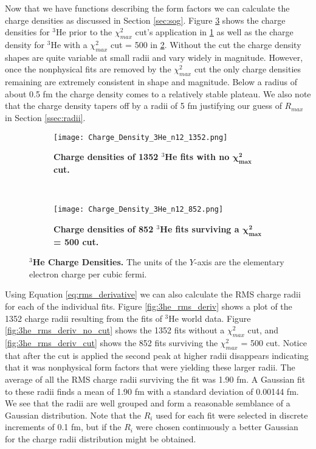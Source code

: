 Now that we have functions describing the form factors we can calculate the charge densities as discussed in Section \ref{sec:sog}. Figure \ref{fig:3he_charge_density} shows the charge densities for $^3$He prior to the $\chi^2_{max}$ cut's application in \ref{fig:3he_charge_density_no_cut} as well as the charge density for $^3$He with a $\chi^2_{max}$ cut = 500 in \ref{fig:3he_charge_density_cut}. Without the cut the charge density shapes are quite variable at small radii and vary widely in magnitude. However, once the nonphysical fits are removed by the $\chi^2_{max}$ cut the only charge densities remaining are extremely consistent in shape and magnitude. Below a radius of about 0.5 fm the charge density comes to a relatively stable plateau. We also note that the charge density tapers off by a radii of 5 fm justifying our guess of $R_{max}$ in Section \ref{ssec:radii}. %

\begin{figure}[!ht]
\begin{subfigure}{1.\textwidth}
  \centering
  \texttt{[image: Charge\_Density\_3He\_n12\_1352.png]}
  \caption{\bf{Charge densities of 1352 $^3$He fits with no $\boldsymbol{\chi^2_{max}}$ cut.}}
  \label{fig:3he_charge_density_no_cut}
\end{subfigure}\\
\begin{subfigure}{1.\textwidth}
  \centering
  \texttt{[image: Charge\_Density\_3He\_n12\_852.png]}
  \caption{\bf{Charge densities of 852 $^3$He fits surviving a $\boldsymbol{\chi^2_{max}}$ = 500 cut.}}
  \label{fig:3he_charge_density_cut}
\end{subfigure}
\caption[$^3$He Charge Densities]{{\bf{$^3$He Charge Densities.}} The units of the $Y$-axis are the elementary electron charge per cubic fermi.}
\label{fig:3he_charge_density}
\end{figure}

Using Equation \ref{eq:rms_derivative} we can also calculate the RMS charge radii for each of the individual fits. Figure \ref{fig:3he_rms_deriv} shows a plot of the 1352 charge radii resulting from the fits of $^3$He world data. Figure \ref{fig:3he_rms_deriv_no_cut} shows the 1352 fits without a $\chi^2_{max}$ cut, and \ref{fig:3he_rms_deriv_cut} shows the 852 fits surviving the $\chi^2_{max}$ = 500 cut. Notice that after the cut is applied the second peak at higher radii disappears indicating that it was nonphysical form factors that were yielding these larger radii. The average of all the RMS charge radii surviving the fit was 1.90 fm. A Gaussian fit to these radii finds a mean of 1.90 fm with a standard deviation of 0.00144 fm. We see that the radii are well grouped and form a reasonable semblance of a Gaussian distribution. Note that the $R_i$ used for each fit were selected in discrete increments of 0.1 fm, but if the $R_i$ were chosen continuously a better Gaussian for the charge radii distribution might be obtained. %

